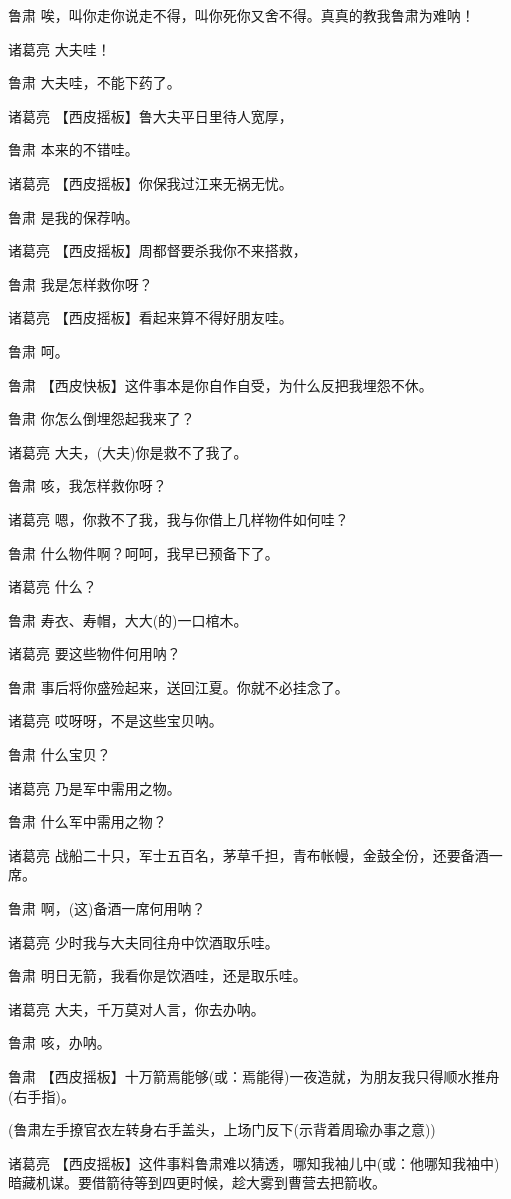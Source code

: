 鲁肃 唉，叫你走你说走不得，叫你死你又舍不得。真真的教我鲁肃为难呐！

诸葛亮 大夫哇！

鲁肃 大夫哇，不能下药了。

诸葛亮 【西皮摇板】鲁大夫平日里待人宽厚，

鲁肃 本来的不错哇。

诸葛亮 【西皮摇板】你保我过江来无祸无忧。

鲁肃 是我的保荐呐。

诸葛亮 【西皮摇板】周都督要杀我你不来搭救，

鲁肃 我是怎样救你呀？

诸葛亮 【西皮摇板】看起来算不得好朋友哇。

鲁肃 呵。

鲁肃 【西皮快板】这件事本是你自作自受，为什么反把我埋怨不休。

鲁肃 你怎么倒埋怨起我来了？

诸葛亮 大夫，(大夫)你是救不了我了。

鲁肃 咳，我怎样救你呀？

诸葛亮 嗯，你救不了我，我与你借上几样物件如何哇？

鲁肃 什么物件啊？呵呵，我早已预备下了。

诸葛亮 什么？

鲁肃 寿衣、寿帽，大大(的)一口棺木。

诸葛亮 要这些物件何用呐？

鲁肃 事后将你盛殓起来，送回江夏。你就不必挂念了。

诸葛亮 哎呀呀，不是这些宝贝呐。

鲁肃 什么宝贝？

诸葛亮 乃是军中需用之物。

鲁肃 什么军中需用之物？

诸葛亮
战船二十只，军士五百名，茅草千担，青布帐幔，金鼓全份，还要备酒一席。

鲁肃 啊，(这)备酒一席何用呐？

诸葛亮 少时我与大夫同往舟中饮酒取乐哇。

鲁肃 明日无箭，我看你是饮酒哇，还是取乐哇。

诸葛亮 大夫，千万莫对人言，你去办呐。

鲁肃 咳，办呐。

鲁肃
【西皮摇板】十万箭焉能够(或：焉能得)一夜造就，为朋友我只得顺水推舟(右手指)。

(鲁肃左手撩官衣左转身右手盖头，上场门反下(示背着周瑜办事之意))

诸葛亮
【西皮摇板】这件事料鲁肃难以猜透，哪知我袖儿中(或：他哪知我袖中)暗藏机谋。要借箭待等到四更时候，趁大雾到曹营去把箭收。

